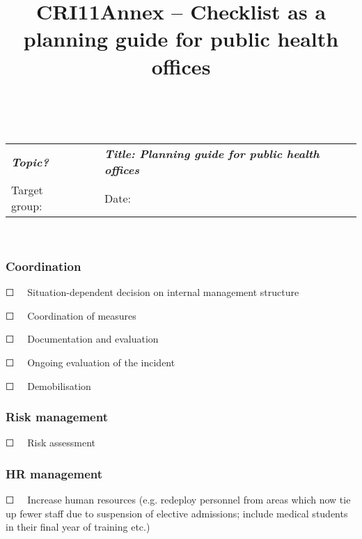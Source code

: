 \documentclass{article}
\begin{document}
\title{CRI11Annex – Checklist as a planning guide for public health offices}

\maketitle





 


\begin{tabu} to \textwidth { |X|X|X| }
\hline



\emph{\textbf{Topic?}}  &  & \emph{\textbf{Title: Planning guide for public health offices}}
 \\


Target group:  &  & Date:
 \\
\hline

\end{tabu}

   


\subsubsection{Coordination}\label{H2442121}



☐   Situation-dependent decision on internal management structure


☐   Coordination of measures


☐   Documentation and evaluation


☐   Ongoing evaluation of the incident


☐   Demobilisation


\subsubsection{Risk management}\label{H3384617}



☐   Risk assessment 


\subsubsection{HR management}\label{H9541090}



☐   Increase human resources (e.g. redeploy personnel from areas which now tie up fewer staff due to suspension of elective admissions; include medical students in their final year of training etc.)
\end{document}
